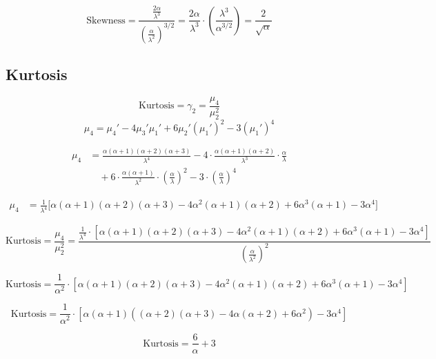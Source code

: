 \documentclass{article}
\begin{document}
\[
    \text{Skewness} = \frac{\frac{2\alpha}{\lambda^3}}{\left( \frac{\alpha}{\lambda^2} \right)^{3/2}}
    = \frac{2\alpha}{\lambda^3} \cdot \left( \frac{\lambda^3}{\alpha^{3/2}} \right)
    = \frac{2}{\sqrt{\alpha}}
\]
\subsection{Kurtosis}
\[
    \text{Kurtosis} = \gamma_2 = \frac{\mu_4}{\mu_2^2}
\]
\[
    \mu_4 = \mu_4' - 4\mu_3'\mu_1' + 6\mu_2'(\mu_1')^2 - 3(\mu_1')^4
\]

\[
    \begin{aligned}
        \mu_4 & =
        \frac{\alpha(\alpha + 1)(\alpha + 2)(\alpha + 3)}{\lambda^4}
        - 4 \cdot \frac{\alpha(\alpha + 1)(\alpha + 2)}{\lambda^3} \cdot \frac{\alpha}{\lambda}                    \\
              & \quad + 6 \cdot \frac{\alpha(\alpha + 1)}{\lambda^2} \cdot \left( \frac{\alpha}{\lambda} \right)^2
        - 3 \cdot \left( \frac{\alpha}{\lambda} \right)^4
    \end{aligned}
\]

\[
    \begin{aligned}
        \mu_4 & = \frac{1}{\lambda^4} \Big[
            \alpha(\alpha + 1)(\alpha + 2)(\alpha + 3)
            - 4\alpha^2(\alpha + 1)(\alpha + 2)
            + 6\alpha^3(\alpha + 1)
            - 3\alpha^4
            \Big]
    \end{aligned}
\]

\[
    \text{Kurtosis} = \frac{\mu_4}{\mu_2^2} =
    \frac{ \frac{1}{\lambda^4} \cdot \left[
            \alpha(\alpha + 1)(\alpha + 2)(\alpha + 3)
            - 4\alpha^2(\alpha + 1)(\alpha + 2)
            + 6\alpha^3(\alpha + 1)
            - 3\alpha^4 \right] }
    { \left( \frac{\alpha}{\lambda^2} \right)^2 }
\]

\[
    \text{Kurtosis} = \frac{1}{\alpha^2} \cdot \left[
        \alpha(\alpha + 1)(\alpha + 2)(\alpha + 3)
        - 4\alpha^2(\alpha + 1)(\alpha + 2)
        + 6\alpha^3(\alpha + 1)
        - 3\alpha^4 \right]
\]

\[
    \text{Kurtosis} =
    \frac{1}{\alpha^2} \cdot \left[
        \alpha(\alpha + 1)\left((\alpha + 2)(\alpha + 3)
        - 4\alpha(\alpha + 2)
        + 6\alpha^2
        \right) - 3\alpha^4 \right]
\]

\[
    \text{Kurtosis} = \frac{6}{\alpha} + 3
\]
\end{document}
